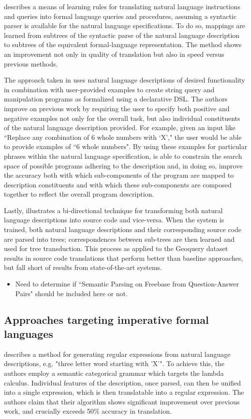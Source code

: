 \documentclass[a4paper,11pt]{proposal}
\begin{document}
\cite{kate2005} describes a means of learning rules for translating natural language instructions and queries into formal language queries and procedures, assuming a syntactic parser is available for the natural language specifications. To do so, mappings are learned from subtrees of the syntactic parse of the natural language description to subtrees of the equivalent formal-language representation. The method shows an improvement not only in quality of translation but also in speed versus previous methods.

The approach taken in \cite{raza2015} uses natural language descriptions of desired functionality in combination with user-provided examples to create string query and manipulation programs as formalized using a declarative DSL. The authors improve on previous work by requiring the user to specify both positive and negative examples not only for the overall task, but also individual constituents of the natural language description provided. For example, given an input like ``Replace any combination of 6 whole numbers with `X'," the user would be able to provide examples of ``6 whole numbers". By using these examples for particular phrases within the natural language specification, \cite{raza2015} is able to constrain the search space of possible programs adhering to the description and, in doing so, improve the accuracy both with which sub-components of the program are mapped to description constituents and with which these sub-components are composed together to reflect the overall program description.

Lastly, \cite{karampatsis2015} illustrates a bi-directional technique for transforming both natural language descriptions into source code and vice-versa. When the system is trained, both natural language descriptions and their corresponding source code are parsed into trees; correspondences between sub-trees are then learned and used for tree transduction. This process as applied to the Geoquery dataset results in source code translations that perform better than baseline approaches, but fall short of results from state-of-the-art systems.

\begin{itemize}
\item Need to determine if ``Semantic Parsing on Freebase from Question-Answer Pairs" \cite{berant2013} should be included here or not.
\end{itemize}


\subsection{Approaches targeting imperative formal languages}
\cite{kushman2013} describes a method for generating regular expressions from natural language descriptions, e.g. "three letter word starting with ’X’". To achieve this, the authors employ a semantic categorical grammar which targets the lambda calculus. Individual features of the description, once parsed, can then be unified into a single expression, which is then translatable into a regular expression. The authors claim that their algorithm shows significant improvement over previous work, and crucially exceeds 50\% accuracy in translation.
\end{document}
